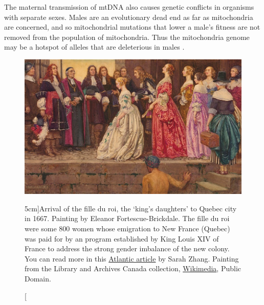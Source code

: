 {The maternal transmission of mtDNA also causes genetic conflicts in organisms
with separate sexes. Males are an evolutionary dead end as far as
mitochondria are concerned, and so mitochondrial mutations that lower a male's
fitness are not removed from the population of mitochondria. Thus the
mitochondria genome may be a hotspot of alleles that are deleterious in males
\citep[an effect termed the ``Mother's curse''][]{cosmides1981cytoplasmic,frank1996mitochondria}.
 \begin{figure}
\begin{center}
  \includegraphics[width= \textwidth]{illustration_images/single_locus_selection/fille_du_roi/fille_du_roi.png}
\end{center}
\caption[][5cm]{Arrival of the fille du roi, the `king's daughters' to
  Quebec city in 1667. Painting
  by Eleanor Fortescue-Brickdale.  The fille du roi were some 800 women whose emigration to New France (Quebec) was paid for by an program established by
  King Louis XIV of France to address the strong gender imbalance of
  the new colony. You can read more in this \href{https://www.theatlantic.com/science/archive/2017/09/how-a-fille-du-roy-brought-the-mothers-curse-to-canada/540153/}{Atlantic article} by Sarah Zhang.
\newline \noindent \tiny{
 Painting from the Library and Archives Canada collection,
 \href{https://commons.wikimedia.org/wiki/File:Arrival_of_the_Brides_-_Eleanor_Fortescue-Brickdale.png}{Wikimedia},
 Public Domain.}} \label{fig:fille_du_roi}  %
\end{figure}
}
